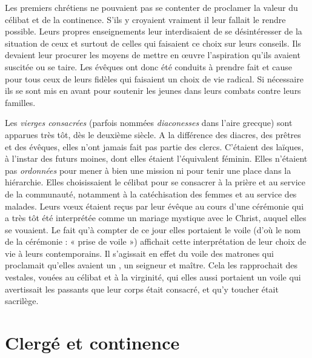  Les premiers chrétiens ne pouvaient pas se contenter de proclamer la valeur du célibat et de la continence. S'ils y croyaient vraiment il leur fallait le rendre possible. Leurs propres enseignements leur interdisaient de se désintéresser de la situation de ceux et surtout de celles qui faisaient ce choix sur leurs conseils. Ils devaient leur procurer les moyens de mettre en œuvre l'aspiration qu'ils avaient suscitée ou se taire. Les évêques ont donc été conduits à prendre fait et cause pour tous ceux de leurs fidèles qui faisaient un choix de vie radical. Si nécessaire ils se sont mis en avant pour soutenir les jeunes dans leurs combats contre leurs familles. 

 Les \emph{vierges consacrées} (parfois nommées \emph{diaconesses} dans l'aire grecque) sont apparues très tôt, dès le deuxième siècle. A la différence des diacres, des prêtres et des évêques, elles n'ont jamais fait pas partie des clercs. C'étaient des laïques, à l'instar des futurs moines, dont elles étaient l'équivalent féminin. Elles n'étaient pas \emph{ordonnées} pour mener à bien une mission ni pour tenir une place dans la hiérarchie. Elles choisissaient le célibat pour se consacrer à la prière et au service de la communauté, notamment à la catéchisation des femmes et au service des malades. Leurs vœux étaient reçus par leur évêque au cours d'une cérémonie qui a très tôt été interprétée comme un mariage mystique avec le Christ, auquel elles se vouaient. Le fait qu'à compter de ce jour elles portaient le voile (d'où le nom de la cérémonie : « prise de voile ») affichait cette interprétation de leur choix de vie à leurs contemporains. Il s'agissait en effet du voile des matrones qui proclamait qu'elles avaient un , un seigneur et maître. Cela les rapprochait des vestales, vouées au célibat et à la virginité, qui elles aussi portaient un voile qui avertissait les passants que leur corps était consacré, et qu'y toucher était sacrilège.


\section{Clergé et continence}

